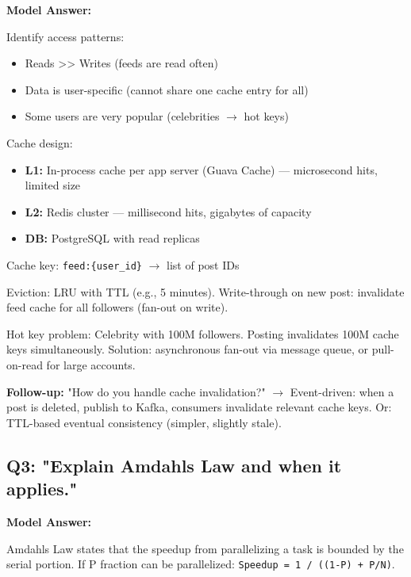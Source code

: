 \documentclass[11pt]{article}
\providecommand{\tightlist}{\setlength{\itemsep}{1pt}\setlength{\parskip}{0pt}}
\begin{document}
\textbf{Model Answer:}

Identify access patterns:

\begin{itemize}
\tightlist
\item
  Reads \textgreater\textgreater{} Writes (feeds are read often)
\item
  Data is user-specific (cannot share one cache entry for all)
\item
  Some users are very popular (celebrities \(\rightarrow\) hot keys)
\end{itemize}

Cache design:

\begin{itemize}
\tightlist
\item
  \textbf{L1:} In-process cache per app server (Guava Cache) --- microsecond hits, limited size
\item
  \textbf{L2:} Redis cluster --- millisecond hits, gigabytes of capacity
\item
  \textbf{DB:} PostgreSQL with read replicas
\end{itemize}

Cache key: \texttt{feed:\{user\_id\}} \(\rightarrow\) list of post IDs

Eviction: LRU with TTL (e.g., 5 minutes). Write-through on new post: invalidate feed cache for all followers (fan-out on write).

Hot key problem: Celebrity with 100M followers. Posting invalidates 100M cache keys simultaneously. Solution: asynchronous fan-out via message queue, or pull-on-read for large accounts.

\textbf{Follow-up:} "How do you handle cache invalidation?"
\(\rightarrow\) Event-driven: when a post is deleted, publish to Kafka, consumers invalidate relevant cache keys. Or: TTL-based eventual consistency (simpler, slightly stale).

\subsection{Q3: "Explain Amdahl\textquotesingle s Law and when it applies."}\label{q3-explain-amdahls-law-and-when-it-applies}

\textbf{Model Answer:}

Amdahl\textquotesingle s Law states that the speedup from parallelizing a task is bounded by the serial portion. If P fraction can be parallelized: \texttt{Speedup\ =\ 1\ /\ ((1-P)\ +\ P/N)}.
\end{document}
